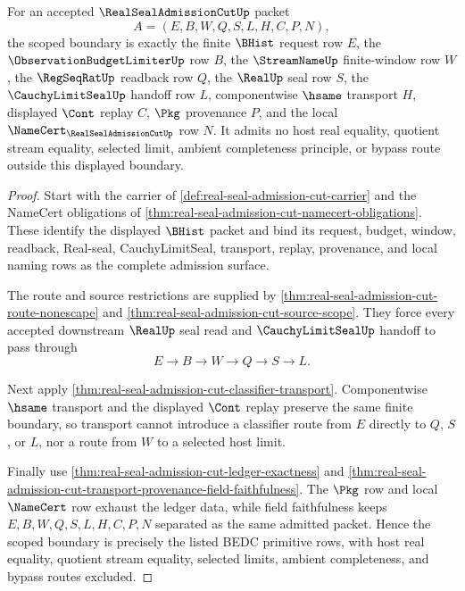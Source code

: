 \begin{theorem}
\label{thm:real-seal-admission-cut-scoped-boundary}
For an accepted $\RealSealAdmissionCutUp$ packet
$$
A=(E,B,W,Q,S,L,H,C,P,N),
$$
the scoped boundary is exactly the finite $\BHist$ request row $E$, the $\ObservationBudgetLimiterUp$ row $B$, the $\StreamNameUp$ finite-window row $W$, the $\RegSeqRatUp$ readback row $Q$, the $\RealUp$ seal row $S$, the $\CauchyLimitSealUp$ handoff row $L$, componentwise $\hsame$ transport $H$, displayed $\Cont$ replay $C$, $\Pkg$ provenance $P$, and the local $\NameCert_{\RealSealAdmissionCutUp}$ row $N$. It admits no host real equality, quotient stream equality, selected limit, ambient completeness principle, or bypass route outside this displayed boundary.
\end{theorem}
\begin{proof}
Start with the carrier of \autoref{def:real-seal-admission-cut-carrier} and the NameCert obligations of \autoref{thm:real-seal-admission-cut-namecert-obligations}. These identify the displayed $\BHist$ packet and bind its request, budget, window, readback, Real-seal, CauchyLimitSeal, transport, replay, provenance, and local naming rows as the complete admission surface.

The route and source restrictions are supplied by \autoref{thm:real-seal-admission-cut-route-nonescape} and \autoref{thm:real-seal-admission-cut-source-scope}. They force every accepted downstream $\RealUp$ seal read and $\CauchyLimitSealUp$ handoff to pass through
$$
E \to B \to W \to Q \to S \to L .
$$

Next apply \autoref{thm:real-seal-admission-cut-classifier-transport}. Componentwise $\hsame$ transport and the displayed $\Cont$ replay preserve the same finite boundary, so transport cannot introduce a classifier route from $E$ directly to $Q$, $S$, or $L$, nor a route from $W$ to a selected host limit.

Finally use \autoref{thm:real-seal-admission-cut-ledger-exactness} and \autoref{thm:real-seal-admission-cut-transport-provenance-field-faithfulness}. The $\Pkg$ row and local $\NameCert$ row exhaust the ledger data, while field faithfulness keeps $E,B,W,Q,S,L,H,C,P,N$ separated as the same admitted packet. Hence the scoped boundary is precisely the listed BEDC primitive rows, with host real equality, quotient stream equality, selected limits, ambient completeness, and bypass routes excluded.
\end{proof}

